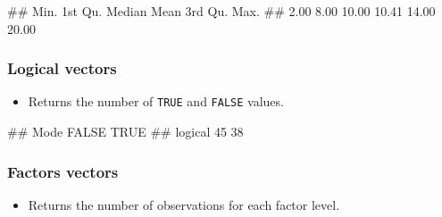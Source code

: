 \documentclass[
]{book}
\newenvironment{Shaded}{\begin{snugshade}}{\end{snugshade}}
\newcommand{\DecValTok}[1]{\textcolor[rgb]{0.00,0.00,0.81}{#1}}
\newcommand{\FunctionTok}[1]{\textcolor[rgb]{0.13,0.29,0.53}{\textbf{#1}}}
\newcommand{\NormalTok}[1]{#1}
\newcommand{\SpecialCharTok}[1]{\textcolor[rgb]{0.81,0.36,0.00}{\textbf{#1}}}
\providecommand{\tightlist}{%
  \setlength{\itemsep}{0pt}\setlength{\parskip}{0pt}}
\begin{document}
\begin{Shaded}
\begin{Highlighting}[]
\NormalTok{\#\#    Min. 1st Qu.  Median    Mean 3rd Qu.    Max. }
\NormalTok{\#\#    2.00    8.00   10.00   10.41   14.00   20.00}
\end{Highlighting}
\end{Shaded}

\hypertarget{logical-vectors}{%
\subsubsection{Logical vectors}\label{logical-vectors}}

\begin{itemize}
\tightlist
\item
  Returns the number of \texttt{TRUE} and \texttt{FALSE} values.
\end{itemize}

\begin{Shaded}
\end{Shaded}

\begin{Shaded}
\begin{Highlighting}[]
\NormalTok{\#\#    Mode   FALSE    TRUE }
\NormalTok{\#\# logical      45      38}
\end{Highlighting}
\end{Shaded}

\hypertarget{factors-vectors}{%
\subsubsection{Factors vectors}\label{factors-vectors}}

\begin{itemize}
\tightlist
\item
  Returns the number of observations for each factor level.
\end{itemize}

\begin{Shaded}
\end{Shaded}
\end{document}
